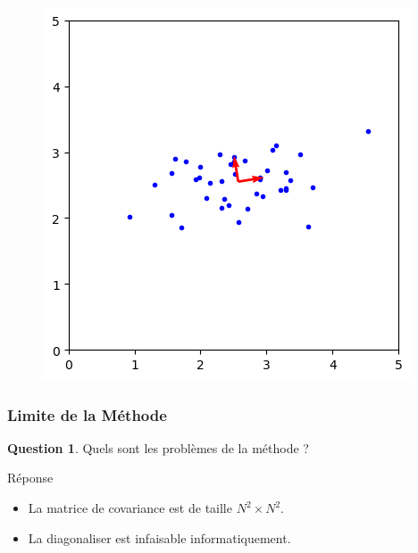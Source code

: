 \documentclass{beamer}
\theoremstyle{plain}
\theoremstyle{definition}
\newtheorem{qst}{Question}
\begin{document}
\begin{frame}
\begin{figure}
\begin{columns}
\begin{overprint}
        \centering\includegraphics[scale=0.5]{src/beamer/figures/fig_pca_4.png}          
      \end{overprint}
    \end{columns}
  \end{figure}
\end{frame}



\begin{frame}
  \frametitle{Limite de la Méthode}
  \begin{qst}
    Quels sont les problèmes de la méthode ?
  \end{qst}

  \pause
  
  \begin{exampleblock}{Réponse}
    \begin{itemize}
    \item La matrice de covariance est de taille $N^2 \times N^2$.
      \pause
    \item La diagonaliser est infaisable informatiquement.
    \end{itemize}
  \end{exampleblock}
\end{frame}
\end{document}
